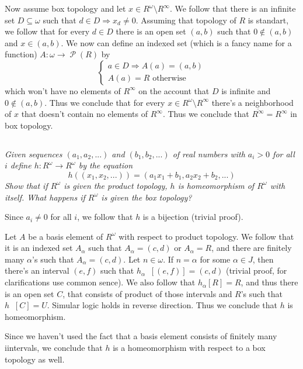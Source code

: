 \documentclass[11pt,oneside,titlepage]{book}
\DeclareMathOperator \pow {\mathcal {P}}
\DeclareMathOperator \inv {^{-1}}
\DeclareMathOperator \ra {\Rightarrow}
\begin{document}
Now assume box topology and let $x \in R^\omega \setminus R^\infty$. We follow that
there is an infinite set $D \subseteq \omega$ such that $d \in D \ra x_d \neq 0$.
Assuming that topology of $R$ is standart, we follow that for every $d \in D$ there
is an open set $(a, b)$ such that $0 \notin (a, b)$ and $x \in (a, b)$.
We now can define an indexed set (which is a fancy name for a function) $A: \omega \to \pow(R)$
by
$$
\begin{cases}
  a \in D \ra A(a) = (a, b) \\
  A(a) = R \text{ otherwise}
\end{cases}
$$
which won't have no elements of $R^\infty$ on the account that $D$ is infinite and $0 \notin (a, b)$.
Thus we conclude that for every $x \in R^\omega \setminus R^\infty$ there's a neighborhood
of $x$ that doesn't contain no elements of $R^\infty$. Thus we conclude that
$\overline{R^\infty} = R^\infty$ in box topology.

\subsection{}

\textit{Given sequences $(a_1, a_2, ...)$ and $(b_1, b_2, ...)$ of real numbers with $a_i > 0$
  for all $i$ define $h: R^\omega \to R^\omega$ by the equation
  $$h((x_1, x_2, ...)) = (a_1 x_1 + b_1, a_2 x_2 + b_2, ...)$$
  Show that if $R^\omega$ is given the product topology, $h$ is homeomorphism of $R^\omega$ with
  itself. What happens if $R^\omega$ is given the box topology?
}

Since $a_i \neq 0$ for all $i$, we follow that $h$ is a bijection (trivial proof).

Let $A$ be a basis element of $R^\omega$ with respect to product topology. We follow that it
is an indexed set $A_\alpha$ such that $A_\alpha = (c, d)$ or $A_\alpha = R$, and there
are finitely many $\alpha$'s such that $A_\alpha = (c, d)$. Let $n \in \omega$.
If $n = \alpha$ for some $\alpha \in J$, then there's an interval $(e, f)$ such that
$h_\alpha\inv[(e, f)] = (c, d)$ (trivial proof, for clarifications use common sence).
We also follow that $h_\alpha[R] = R$, and thus
there is an open set $C$, that consists of product of those intervals and $R$'s such that
$h\inv[C] = U$. Simular logic holds in reverse direction. Thus we conclude that $h$ is
homeomorphism.

Since we haven't used the fact that a basis element consists of finitely many iintervals,
we conclude that $h$ is a homeomorphism with respect to a box topology as well.
\end{document}

